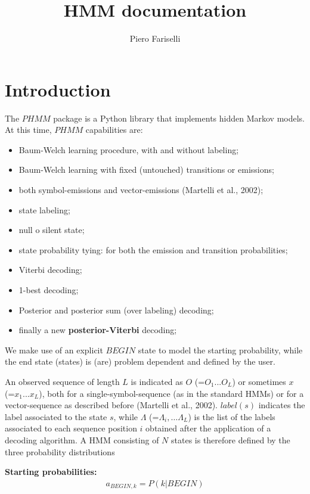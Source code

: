 \documentclass[11pt,english]{article}
\title{HMM documentation}
\author{Piero Fariselli}
\begin{document}
\maketitle

\section{Introduction}

The $PHMM$ package is a Python library that implements hidden Markov models.
At this time, $PHMM$ capabilities are:
\begin{itemize}
\item Baum-Welch learning procedure, with and without labeling;
\item Baum-Welch learning with fixed (untouched) transitions or emissions;
\item both symbol-emissions and vector-emissions (Martelli et al., 2002);  
\item state labeling;
\item null o silent state;
\item state probability tying: for both the emission and transition probabilities;
\item Viterbi decoding;
\item 1-best decoding;
\item Posterior and posterior sum (over labeling) decoding;
\item finally a new {\bf posterior-Viterbi} decoding;
\end{itemize} 

We make use of an explicit $BEGIN$ state to model the starting probability,
while the end state (states) is (are) problem dependent and defined by
the user.
 
An observed sequence of length $L$ is indicated as $O$ (=$O_1...O_L$)
or sometimes $x$ (=$x_1...x_L$),
both for a single-symbol-sequence (as in the standard HMMs) or for
a vector-sequence as described before (Martelli et al., 2002). 
$label(s)$ indicates the label associated to the state $s$, while
$\Lambda$ (=$\Lambda_i,\dots \Lambda_L$) is the list of the labels 
associated to each sequence position $i$ obtained after the application 
of a decoding algorithm.
A HMM consisting of $N$ states is therefore defined by the 
three probability distributions

{\bf Starting probabilities:}
\begin{eqnarray}
a_{BEGIN, k}= P(k|BEGIN)
\end{eqnarray}
\end{document}
